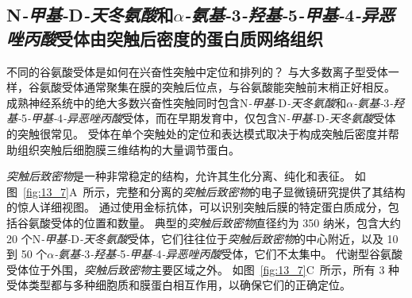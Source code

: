 \subsection{N\textit{-甲基-}D\textit{-天冬氨酸}和\textit{$\alpha$-氨基-}3\textit{-羟基-}5\textit{-甲基-}4\textit{-异恶唑丙酸}受体由突触后密度的蛋白质网络组织}

不同的谷氨酸受体是如何在兴奋性突触中定位和排列的？ 
与大多数离子型受体一样，谷氨酸受体通常聚集在膜的突触后位点，与谷氨酸能突触前末梢正好相反。
成熟神经系统中的绝大多数兴奋性突触同时包含N\textit{-甲基-}D\textit{-天冬氨酸}和\textit{$\alpha$-氨基-}3\textit{-羟基-}5\textit{-甲基-}4\textit{-异恶唑丙酸}受体，而在早期发育中，仅包含N\textit{-甲基-}D\textit{-天冬氨酸}受体的突触很常见。
受体在单个突触处的定位和表达模式取决于构成突触后密度并帮助组织突触后细胞膜三维结构的大量调节蛋白。


\textit{突触后致密物}是一种非常稳定的结构，允许其生化分离、纯化和表征。
如图~\ref{fig:13_7}A~所示，完整和分离的\textit{突触后致密物}的电子显微镜研究提供了其结构的惊人详细视图。
通过使用金标抗体，可以识别突触后膜的特定蛋白质成分，包括谷氨酸受体的位置和数量。
典型的\textit{突触后致密物}直径约为 350 纳米，包含大约 20 个N\textit{-甲基-}D\textit{-天冬氨酸}受体，它们往往位于\textit{突触后致密物}的中心附近，以及 10 到 50 个\textit{$\alpha$-氨基-}3\textit{-羟基-}5\textit{-甲基-}4\textit{-异恶唑丙酸}受体，它们不太集中。
代谢型谷氨酸受体位于外围，\textit{突触后致密物}主要区域之外。
如图~\ref{fig:13_7}C~所示，所有 3 种受体类型都与多种细胞质和膜蛋白相互作用，以确保它们的正确定位。


